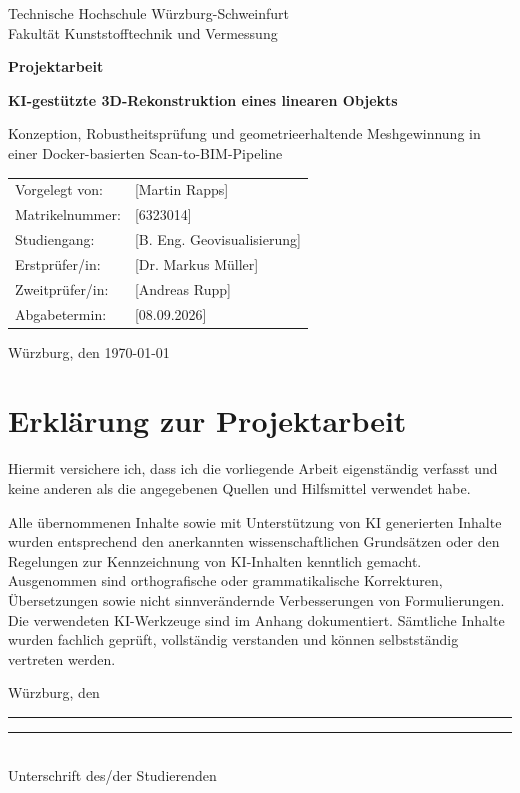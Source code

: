 \documentclass[12pt,a4paper]{article}
\newcommand{\thwsAuthor}{[Martin Rapps]}
\newcommand{\thwsMatriculation}{[6323014]}
\newcommand{\thwsDegree}{[B. Eng. Geovisualisierung]}
\newcommand{\thwsFirstExaminer}{[Dr. Markus Müller]}
\newcommand{\thwsSecondExaminer}{[Andreas Rupp]}
\newcommand{\thwsSubmissionDate}{[08.09.2026]}
\begin{document}
\thispagestyle{empty}
\begin{center}
	{\large Technische Hochschule Würzburg-Schweinfurt\\
	Fakultät Kunststofftechnik und Vermessung\par}
	\vfill
	{\LARGE\bfseries Projektarbeit\par}
	\vspace{1.2cm}
	{\Large\bfseries KI-gestützte 3D-Rekonstruktion eines linearen Objekts\par}
	\vspace{0.4cm}
	{\large Konzeption, Robustheitsprüfung und geometrieerhaltende
	Meshgewinnung in einer Docker-basierten Scan-to-BIM-Pipeline\par}
	\vfill
	\begin{tabular}{@{}ll@{}}
		Vorgelegt von: & \thwsAuthor\\
		Matrikelnummer: & \thwsMatriculation\\
		Studiengang: & \thwsDegree\\
		Erstprüfer/in: & \thwsFirstExaminer\\
		Zweitprüfer/in: & \thwsSecondExaminer\\
		Abgabetermin: & \thwsSubmissionDate
	\end{tabular}
	\vfill
	Würzburg, den \today
\end{center}
\clearpage

\section*{Erklärung zur Projektarbeit}
Hiermit versichere ich, dass ich die vorliegende Arbeit eigenständig verfasst
und keine anderen als die angegebenen Quellen und Hilfsmittel verwendet habe.

Alle übernommenen Inhalte sowie mit Unterstützung von KI generierten Inhalte
wurden entsprechend den anerkannten wissenschaftlichen Grundsätzen oder den
Regelungen zur Kennzeichnung von KI-Inhalten kenntlich gemacht. Ausgenommen
sind orthografische oder grammatikalische Korrekturen, Übersetzungen sowie
nicht sinnverändernde Verbesserungen von Formulierungen. Die verwendeten
KI-Werkzeuge sind im Anhang dokumentiert. Sämtliche Inhalte wurden fachlich
geprüft, vollständig verstanden und können selbstständig vertreten werden.

\vfill
\noindent Würzburg, den \rule{4cm}{0.4pt}\hfill
\rule{6cm}{0.4pt}\\
\hfill Unterschrift des/der Studierenden
\clearpage
\end{document}
